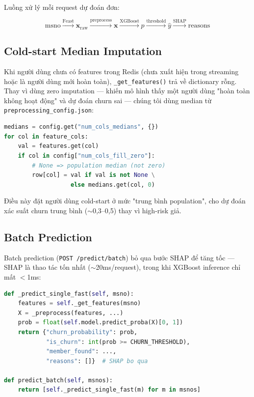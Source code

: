 \documentclass[conference]{IEEEtran}
\begin{document}
Luồng xử lý mỗi request dự đoán đơn:

\begin{equation}
  \text{msno} \xrightarrow{\text{Feast}} \mathbf{x}_\text{raw}
  \xrightarrow{\text{preprocess}} \mathbf{x}
  \xrightarrow{\text{XGBoost}} p
  \xrightarrow{\text{threshold}} \hat{y}
  \xrightarrow{\text{SHAP}} \text{reasons}
\end{equation}

\subsection{Cold-start Median Imputation}

Khi người dùng chưa có features trong Redis (chưa xuất hiện trong streaming
hoặc là người dùng mới hoàn toàn), \texttt{\_get\_features()} trả về
dictionary rỗng. Thay vì dùng zero imputation — khiến mô hình thấy một
người dùng "hoàn toàn không hoạt động" và dự đoán churn sai — chúng tôi
dùng median từ \texttt{preprocessing\_config.json}:

\begin{lstlisting}[language=Python, caption={Median cold-start imputation}]
medians = config.get("num_cols_medians", {})
for col in feature_cols:
    val = features.get(col)
    if col in config["num_cols_fill_zero"]:
        # None => population median (not zero)
        row[col] = val if val is not None \
                   else medians.get(col, 0)
\end{lstlisting}

Điều này đặt người dùng cold-start ở mức "trung bình population", cho dự
đoán xác suất churn trung bình ($\sim$0,3–0,5) thay vì high-risk giả.

\subsection{Batch Prediction}

Batch prediction (\texttt{POST /predict/batch}) bỏ qua bước SHAP để tăng
tốc — SHAP là thao tác tốn nhất ($\sim$20ms/request), trong khi XGBoost
inference chỉ mất $<$1ms:

\begin{lstlisting}[language=Python, caption={Batch prediction không SHAP}]
def _predict_single_fast(self, msno):
    features = self._get_features(msno)
    X = _preprocess(features, ...)
    prob = float(self.model.predict_proba(X)[0, 1])
    return {"churn_probability": prob,
            "is_churn": int(prob >= CHURN_THRESHOLD),
            "member_found": ...,
            "reasons": []}  # SHAP bo qua

def predict_batch(self, msnos):
    return [self._predict_single_fast(m) for m in msnos]
\end{lstlisting}
\end{document}
